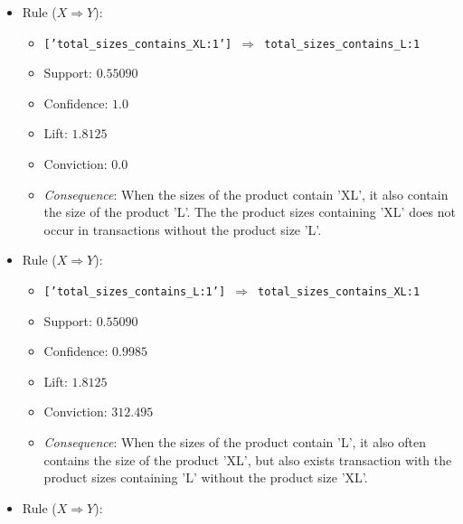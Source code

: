 					\begin{itemize}
						\item Rule ($X \Rightarrow Y$):
							\begin{itemize}
								\item \texttt{['total\_sizes\_contains\_XL:1'] $\Rightarrow$ total\_sizes\_contains\_L:1}
								\item Support: $0.55090$
								\item Confidence: $1.0$
								\item Lift: $1.8125$
								\item Conviction: $0.0$
								\item \emph{Consequence}: \textsf{When the sizes of the product contain 'XL', it also contain the size of the product 'L'. The the product sizes containing 'XL' does not occur in transactions without the product size 'L'.}
							\end{itemize}
						\item Rule ($X \Rightarrow Y$):
							\begin{itemize}
								\item \texttt{['total\_sizes\_contains\_L:1'] $\Rightarrow$ total\_sizes\_contains\_XL:1}
								\item Support: $0.55090$
								\item Confidence: $0.9985$
								\item Lift: $1.8125$
								\item Conviction: $312.495$
								\item \emph{Consequence}: \textsf{When the sizes of the product contain 'L', it also often contains the size of the product 'XL', but also exists transaction with the product sizes containing 'L' without the product size 'XL'.}
							\end{itemize}
						\item Rule ($X \Rightarrow Y$):

\end{itemize}

